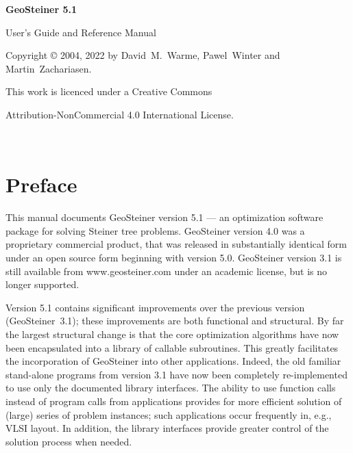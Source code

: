 \documentclass[12pt,twoside,letterpaper]{article}
\def\code#1{{\ttfamily #1}}
\def\geosteiner{Geo\-Steiner}
\newcommand{\GeoSteinerCurrentVersion}{5.1}
\begin{document}
\thispagestyle{empty}
\vspace*{4cm}

\centerline{\Huge\bf \geosteiner{} \GeoSteinerCurrentVersion{}}

\vspace*{3cm}

\centerline{\Large User's Guide and Reference Manual}

\vspace*{10cm}
\centerline{Copyright \copyright{} 2004, 2022 by
 David~M.~Warme, Pawel~Winter and Martin~Zachariasen.}
\centerline{This work is licenced under a Creative Commons}
\centerline{Attribution-NonCommercial 4.0 International License.}

\clearpage
\thispagestyle{empty}
~

\clearpage
{}
\tableofcontents

\clearpage
\setlength{\parskip}{1.5ex plus0.1ex minus0.1ex}
\setlength{\parindent}{0ex}

\pagestyle{headings}
\section*{Preface}

This manual documents \geosteiner{} version
\GeoSteinerCurrentVersion{}
--- an optimization software package for solving Steiner tree
problems.
\geosteiner{} version 4.0 was a proprietary commercial product,
that was released in substantially identical form under an open source
form beginning with version 5.0.
\geosteiner{} version 3.1 is still available from
\code{www.geosteiner.com} under an academic license, but is no
longer supported.

Version \GeoSteinerCurrentVersion{} contains significant improvements
over the previous
version (\geosteiner~3.1); these improvements are both functional and
structural.
By far the largest structural change is that the core
optimization algorithms have now been encapsulated into a library of
callable subroutines.  This greatly facilitates the incorporation of
\geosteiner{} into other applications.  Indeed, the old familiar
stand-alone programs from version 3.1 have now been completely
re-implemented to use only the documented library interfaces.  The
ability to use function calls instead of program calls from
applications provides for more efficient solution of (large) series of
problem instances; such applications occur frequently in, e.g., VLSI
layout.  In addition, the library interfaces provide greater control
of the solution process when needed.
\end{document}
